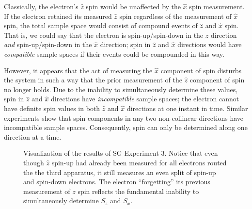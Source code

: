 Classically, the electron's $\hat{z}$ spin would be unaffected by the $\hat{x}$ spin measurement. If the electron retained its measured $\hat{z}$ spin regardless of the measurement of $\hat{x}$ spin, the total sample space would consist of compound events of $\hat{z}$ and $\hat{x}$ spin. That is, we could say that the electron is spin-up/spin-down in the $\hat{z}$ direction \textit{and} spin-up/spin-down in the $\hat{x}$ direction; spin in $\hat{z}$ and $\hat{x}$ directions would have \textit{compatible} sample spaces if their events could be compounded in this way.

However, it appears that the act of measuring the $\hat{x}$ component of spin disturbs the system in such a way that the prior measurement of the $\hat{z}$ component of spin no longer holds. Due to the inability to simultaneously determine these values, spin in $\hat{z}$ and $\hat{x}$ directions have \textit{incompatible} sample spaces; the electron cannot have definite spin values in both $\hat{z}$ and $\hat{x}$ directions at one instant in time. Similar experiments show that spin components in any two non-collinear directions have incompatible sample spaces. Consequently, spin can only be determined along one direction at a time.

\begin{figure}
\centering\CaptionFontSize
{}

\caption[Results of Stern-Gerlach Experiment 3]
{Visualization of the results of SG Experiment 3. Notice that even though $\hat{z}$ spin-up had already been measured for all electrons routed the the third apparatus, it still measures an even split of spin-up and spin-down electrons. The electron ``forgetting'' its previous measurement of $z$ spin reflects the fundamental inability to simultaneously determine $S_z$ and $S_x$.}
\label{Figure:Exp 3}
\end{figure}
